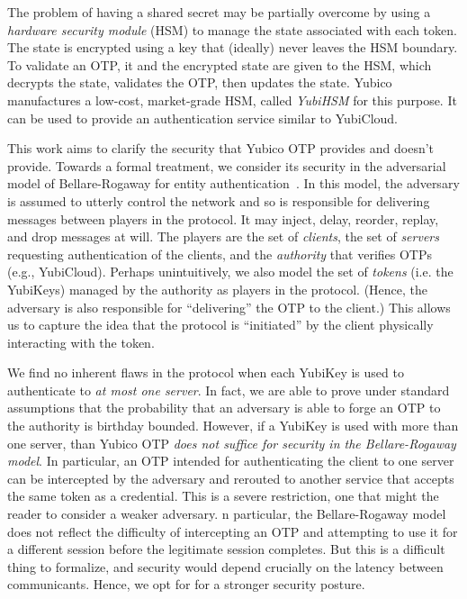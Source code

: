 The problem of having a shared secret may be partially overcome by using
a \emph{hardware security module} (HSM) to manage the state associated with each
token. The state is encrypted using a key that (ideally) never leaves the HSM
boundary. To validate an OTP, it and the encrypted state are given to the HSM,
which decrypts the state, validates the OTP, then updates the state.
%
Yubico manufactures a low-cost, market-grade HSM, called \emph{YubiHSM} for this
purpose. It can be used to provide an authentication service similar to
YubiCloud.

This work aims to clarify the security that Yubico OTP provides and doesn't
provide. Towards a formal treatment, we consider its security in the adversarial
model of Bellare-Rogaway for entity authentication~\cite{bellare1993entity}.
%
In this model, the adversary is assumed to utterly control the network and so is
responsible for delivering messages between players in the protocol.
%
It may inject, delay, reorder, replay, and drop messages at will.
%
The players are the set of \emph{clients}, the set of \emph{servers} requesting
authentication of the clients, and the \emph{authority} that verifies OTPs
(e.g., YubiCloud).
%
Perhaps unintuitively, we also model the set of \emph{tokens} (i.e. the YubiKeys)
managed by the authority as players in the protocol. (Hence, the adversary is
also responsible for ``delivering'' the OTP to the client.) This allows us to
capture the idea that the protocol is ``initiated'' by the client physically
interacting with the token.

We find no inherent flaws in the protocol when each YubiKey is used to
authenticate to \emph{at most one server}. In fact, we are able to prove under
standard assumptions that the probability that an adversary is able to forge an
OTP to the authority is birthday bounded.
%
However, if a YubiKey is used with more than one server, than Yubico OTP
\emph{does not suffice for security in the Bellare-Rogaway model}.
%
In particular, an OTP intended for authenticating the client to one server can
be intercepted by the adversary and rerouted to another service that accepts the
same token as a credential.
%
This is a severe restriction, one that might the reader to consider a weaker
adversary. n particular, the Bellare-Rogaway model does not reflect the
difficulty of intercepting an OTP and attempting to use it for a different
session before the legitimate session completes. But this is a difficult thing
to formalize, and security would depend crucially on the latency between
communicants. Hence, we opt for for a stronger security posture.

